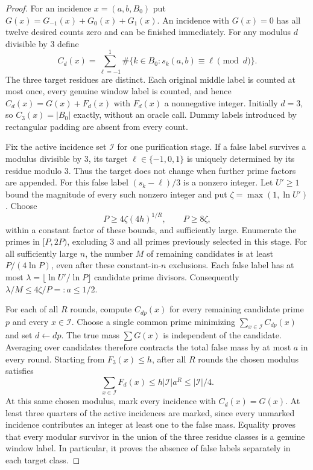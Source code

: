 \documentclass[11pt]{article}
\begin{document}
\begin{proof}
For an incidence $x=(a,b,B_0)$ put $G(x)=G_{-1}(x)+G_0(x)+G_1(x)$.
An incidence with $G(x)=0$ has all twelve desired counts zero and can be
finished immediately.  For any modulus $d$ divisible by $3$ define
\[
 C_d(x)=\sum_{\ell=-1}^{1}
       \#\{k\in B_0:s_k(a,b)\equiv\ell\pmod d\}.
\]
The three target residues are distinct.  Each original middle label is
counted at most once, every genuine window label is counted, and hence
$C_d(x)=G(x)+F_d(x)$ with $F_d(x)$ a nonnegative integer.  Initially
$d=3$, so $C_3(x)=|B_0|$ exactly, without an oracle call.  Dummy labels
introduced by rectangular padding are absent from every count.

Fix the active incidence set $\mathcal I$ for one purification stage.
If a false label survives a modulus divisible by $3$, its target
$\ell\in\{-1,0,1\}$ is uniquely determined by its residue modulo $3$.
Thus the target does not change when further prime factors are appended.
For this false label $(s_k-\ell)/3$ is a nonzero integer.  Let
$U'\ge1$ bound the magnitude of every such nonzero integer and put
$\zeta=\max(1,\ln U')$.  Choose
\[
 P\ge 4\zeta(4h)^{1/R},\qquad P\ge8\zeta,
\]
within a constant factor of these bounds, and sufficiently large.
Enumerate the primes in $[P,2P)$, excluding $3$ and all primes previously
selected in this stage.  For all sufficiently large $n$, the number $M$
of remaining candidates is at least $P/(4\ln P)$, even after these
constant-in-$n$ exclusions.  Each false label has at most
$\lambda=\lfloor\ln U'/\ln P\rfloor$ candidate prime divisors.
Consequently $\lambda/M\le4\zeta/P=:a\le1/2$.

For each of all $R$ rounds, compute $C_{dp}(x)$ for every remaining
candidate prime $p$ and every $x\in\mathcal I$.  Choose a single common
prime minimizing $\sum_{x\in\mathcal I}C_{dp}(x)$ and set $d\gets dp$.
The true mass $\sum G(x)$ is independent of the candidate.  Averaging
over candidates therefore contracts the total false mass by at most
$a$ in every round.  Starting from $F_3(x)\le h$, after all $R$ rounds
the chosen modulus satisfies
\[
 \sum_{x\in\mathcal I}F_d(x)
 \le h|\mathcal I|a^R\le |\mathcal I|/4.
\]
At this same chosen modulus, mark every incidence with $C_d(x)=G(x)$.
At least three quarters of the active incidences are marked, since
every unmarked incidence contributes an integer at least one to the
false mass.  Equality proves that every modular survivor in the union
of the three residue classes is a genuine window label.  In particular,
it proves the absence of false labels separately in each target class.


\end{proof}
\end{document}
